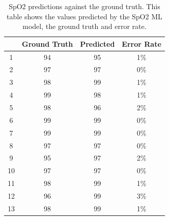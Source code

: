 \documentclass{bmcart}
\begin{document}
\begin{table}[h!]
\caption{SpO2 predictions against the ground truth. This table shows the values predicted by the SpO2 ML model, the ground truth and error rate.}
      \begin{tabular}{cccc}
        \hline
           & Ground Truth  & Predicted & Error Rate\\ \hline
        1 & 94 & 95 & 1\%\\
        2 & 97 & 97 & 0\%\\
        3 & 98 & 99 & 1\%\\
        4 & 99 & 98 & 1\%\\
        5 & 98 & 96 & 2\%\\
        6 & 99 & 99 & 0\%\\
        7 & 99 & 99 & 0\%\\
        8 & 97 & 97 & 0\%\\
        9 & 95 & 97 & 2\%\\
        10& 97 & 97 & 0\%\\
        11& 98 & 99 & 1\%\\
        12& 96 & 99 & 3\%\\
        13& 98 & 99 & 1\%\\ \hline
      \end{tabular}
\end{table}
\end{document}
